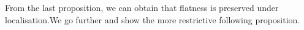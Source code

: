 \documentclass{article}
\theoremstyle{plain}
\newtheorem{proposition}[theorem]{Proposition}
\theoremstyle{definition}
\begin{document}

\noindent From the last proposition, we can obtain that flatness is preserved under localisation.We go further and show the more restrictive following proposition.
\end{document}
